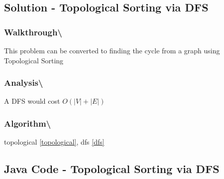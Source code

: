 \documentclass[]{book}
\begin{document}
\hypertarget{solution---topological-sorting-via-dfs}{%
\subsection{Solution - Topological Sorting via DFS}\label{solution---topological-sorting-via-dfs}}

\hypertarget{walkthrough-98}{%
\subsubsection{Walkthrough\textbackslash{}}\label{walkthrough-98}}

This problem can be converted to finding the cycle from a graph using Topological Sorting

\hypertarget{analysis-105}{%
\subsubsection{Analysis\textbackslash{}}\label{analysis-105}}

A DFS would cost \(O(|V| + |E|)\)

\hypertarget{algorithm-111}{%
\subsubsection{Algorithm\textbackslash{}}\label{algorithm-111}}

topological \ref{topological}, dfs \ref{dfs}

\hypertarget{java-code---topological-sorting-via-dfs}{%
\subsection{Java Code - Topological Sorting via DFS}\label{java-code---topological-sorting-via-dfs}}
\end{document}
